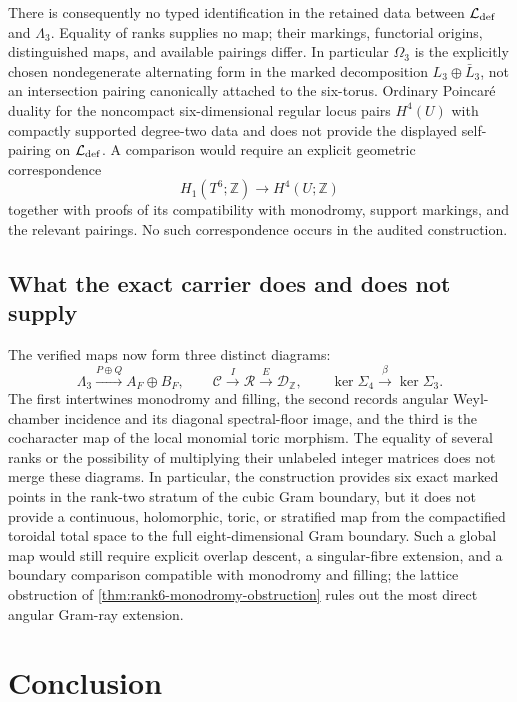 \documentclass[11pt]{article}
\theoremstyle{definition}
\theoremstyle{remark}
\numberwithin{equation}{section}
\begin{document}
There is consequently no typed identification in the retained data between
\(\mathcal L_{\rm def}\) and \(\Lambda_3\).  Equality of ranks supplies no
map; their markings, functorial origins, distinguished maps, and available
pairings differ.  In particular \(\Omega_3\) is the explicitly chosen
nondegenerate alternating form in the marked decomposition
\(L_3\oplus\bar L_3\), not an intersection pairing canonically attached to
the six-torus.  Ordinary Poincar\'e duality for the noncompact
six-dimensional regular locus pairs \(H^4(U)\) with compactly supported
degree-two data and does not provide the displayed self-pairing on
\(\mathcal L_{\rm def}\).  A comparison would require an explicit geometric
correspondence
\[
 H_1(T^6;\mathbb Z)\longrightarrow H^4(U;\mathbb Z)
\]
together with proofs of its compatibility with monodromy, support markings,
and the relevant pairings.  No such correspondence occurs in the audited
construction.

\subsection{What the exact carrier does and does not supply}

The verified maps now form three distinct diagrams:
\[
 \Lambda_3\xrightarrow{P\oplus Q}A_F\oplus B_F,
 \qquad
 \mathscr C\xrightarrow{I}\mathscr R\xrightarrow{E}\mathscr D_{\mathbb Z},
 \qquad
 \ker\Sigma_4\xrightarrow{\beta}\ker\Sigma_3.
\]
The first intertwines monodromy and filling, the second records angular
Weyl-chamber incidence and its diagonal spectral-floor image, and the third
is the cocharacter map of the local monomial toric morphism.  The equality
of several ranks or the possibility of multiplying their unlabeled integer
matrices does not merge these diagrams.  In particular, the construction
provides six exact marked points in the rank-two stratum of the cubic Gram
boundary, but it does not provide a continuous, holomorphic, toric, or
stratified map from the compactified toroidal total space to the full
eight-dimensional Gram boundary.  Such a global map would still require
explicit overlap descent, a singular-fibre extension, and a boundary
comparison compatible with monodromy and filling; the lattice obstruction
of \cref{thm:rank6-monodromy-obstruction} rules out the most direct angular
Gram-ray extension.

\section*{Conclusion}
\end{document}
